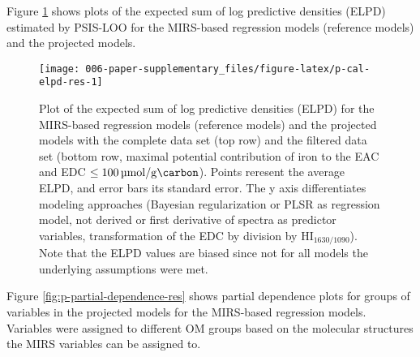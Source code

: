 \documentclass[draft,linenumbers]{agujournal2018}
\begin{document}
\clearpage

Figure \ref{fig:p-cal-elpd-res} shows plots of the expected sum of log
predictive densities (ELPD) estimated by PSIS-LOO
\citep{Piironen.2020, Piironen.2019} for the MIRS-based regression
models (reference models) and the projected models.

\begin{figure}[H]

{\centering \texttt{[image: 006-paper-supplementary\_files/figure-latex/p-cal-elpd-res-1]} 

}

\caption{Plot of the expected sum of log predictive densities (ELPD) for the MIRS-based regression models (reference models) and the projected models with the complete data set (top row) and the filtered data set (bottom row, maximal potential contribution of iron to the EAC and EDC $\le\SI{100}{\micro\mol\per\gram\carbon}$). Points reresent the average ELPD, and error bars its standard error. The y axis differentiates modeling approaches (Bayesian regularization or PLSR as regression model, not derived or first derivative of spectra as predictor variables, transformation of the EDC by division by HI$_\text{1630/1090}$). Note that the ELPD values are biased since not for all models the underlying assumptions were met.}\label{fig:p-cal-elpd-res}
\end{figure}

\clearpage

Figure \ref{fig:p-partial-dependence-res} shows partial dependence plots
for groups of variables in the projected models for the MIRS-based
regression models. Variables were assigned to different OM groups based
on the molecular structures the MIRS variables can be assigned to.
\end{document}
